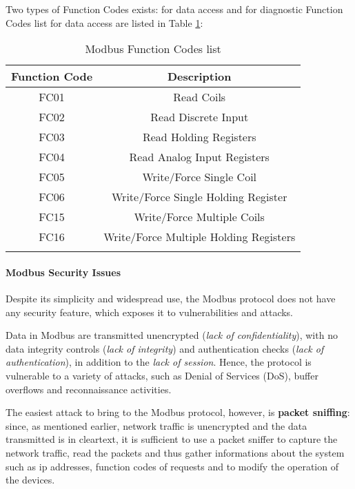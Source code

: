 \bigskip
Two types of Function Codes exists: for data access and for diagnostic
Function Codes list for data access are listed in Table \ref{table:modbus_fc_list}:

\bigskip
\begin{longtable}[c]{| c | c |}
	\hline
	\textbf{Function Code} & \textbf{Description} \\ [0.5ex] 
	\hline
	FC01 & Read Coils \\
	\hline 
	FC02 & Read Discrete Input \\
	\hline
	FC03 & Read Holding Registers \\
	\hline
	FC04 & Read Analog Input Registers \\
	\hline
	FC05 & Write/Force Single Coil \\ 
	\hline
	FC06 & Write/Force Single Holding Register \\ 
	\hline 
	FC15 & Write/Force Multiple Coils \\ 
	\hline
	FC16 & Write/Force Multiple Holding Registers \\ 
	\hline
	
	\caption{Modbus Function Codes list}
	\label{table:modbus_fc_list}
\end{longtable}

\paragraph{Modbus Security Issues}
\label{subsub:modbus_sec}
Despite its simplicity and widespread use, the Modbus protocol does not have any security feature, which exposes it to vulnerabilities and attacks.

Data in Modbus are transmitted unencrypted (\textit{lack of confidentiality}), with no data integrity controls (\textit{lack of integrity}) and authentication checks (\textit{lack of authentication}), in addition to the \textit{lack of session}. Hence, the protocol is vulnerable to a variety of attacks, such as Denial of Services (DoS), buffer overflows and reconnaissance activities.

\bigskip
The easiest attack to bring to the Modbus protocol, however, is \textbf{packet sniffing}: since, as mentioned earlier, network traffic is unencrypted and the data transmitted is in cleartext, it is sufficient to use a packet sniffer to capture the network traffic, read the packets and thus gather informations about the system such as ip addresses, function codes of requests and to modify the operation of the devices.

